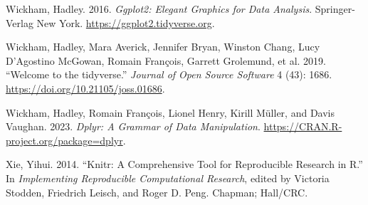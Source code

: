 \documentclass[
  letterpaper,
  DIV=11,
  numbers=noendperiod]{scrartcl}
\newlength{\cslhangindent}
\newenvironment{CSLReferences}[2] %
 {\begin{list}{}{%
  \setlength{\itemindent}{0pt}
  \setlength{\leftmargin}{0pt}
  \setlength{\parsep}{0pt}
  \ifodd #1
   \setlength{\leftmargin}{\cslhangindent}
   \setlength{\itemindent}{-1\cslhangindent}
  \fi
  \setlength{\itemsep}{#2\baselineskip}}}
 {\end{list}}
\begin{document}
\begin{CSLReferences}{1}{0}
Wickham, Hadley. 2016. \emph{Ggplot2: Elegant Graphics for Data
Analysis}. Springer-Verlag New York.
\url{https://ggplot2.tidyverse.org}.

Wickham, Hadley, Mara Averick, Jennifer Bryan, Winston Chang, Lucy
D'Agostino McGowan, Romain François, Garrett Grolemund, et al. 2019.
{``Welcome to the {tidyverse}.''} \emph{Journal of Open Source Software}
4 (43): 1686. \url{https://doi.org/10.21105/joss.01686}.

Wickham, Hadley, Romain François, Lionel Henry, Kirill Müller, and Davis
Vaughan. 2023. \emph{Dplyr: A Grammar of Data Manipulation}.
\url{https://CRAN.R-project.org/package=dplyr}.

Xie, Yihui. 2014. {``Knitr: A Comprehensive Tool for Reproducible
Research in {R}.''} In \emph{Implementing Reproducible Computational
Research}, edited by Victoria Stodden, Friedrich Leisch, and Roger D.
Peng. Chapman; Hall/CRC.

\end{CSLReferences}
\end{document}
